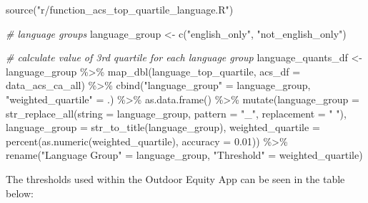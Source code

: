 \documentclass[
  11 pt,
  openany]{book}
\newenvironment{Shaded}{\begin{snugshade}}{\end{snugshade}}
\newcommand{\AttributeTok}[1]{\textcolor[rgb]{0.77,0.63,0.00}{#1}}
\newcommand{\CommentTok}[1]{\textcolor[rgb]{0.56,0.35,0.01}{\textit{#1}}}
\newcommand{\FloatTok}[1]{\textcolor[rgb]{0.00,0.00,0.81}{#1}}
\newcommand{\FunctionTok}[1]{\textcolor[rgb]{0.00,0.00,0.00}{#1}}
\newcommand{\NormalTok}[1]{#1}
\newcommand{\OtherTok}[1]{\textcolor[rgb]{0.56,0.35,0.01}{#1}}
\newcommand{\SpecialCharTok}[1]{\textcolor[rgb]{0.00,0.00,0.00}{#1}}
\newcommand{\StringTok}[1]{\textcolor[rgb]{0.31,0.60,0.02}{#1}}
\begin{document}
\begin{Shaded}
\begin{Highlighting}[]
\FunctionTok{source}\NormalTok{(}\StringTok{"r/function\_acs\_top\_quartile\_language.R"}\NormalTok{)}

\CommentTok{\# language groups}
\NormalTok{language\_group }\OtherTok{\textless{}{-}} \FunctionTok{c}\NormalTok{(}\StringTok{"english\_only"}\NormalTok{, }\StringTok{"not\_english\_only"}\NormalTok{)}

\CommentTok{\# calculate value of 3rd quartile for each language group}
\NormalTok{language\_quants\_df }\OtherTok{\textless{}{-}}
\NormalTok{  language\_group }\SpecialCharTok{\%\textgreater{}\%}
  \FunctionTok{map\_dbl}\NormalTok{(language\_top\_quartile, }\AttributeTok{acs\_df =}\NormalTok{ data\_acs\_ca\_all) }\SpecialCharTok{\%\textgreater{}\%}
  \FunctionTok{cbind}\NormalTok{(}\StringTok{"language\_group"} \OtherTok{=}\NormalTok{ language\_group,}
        \StringTok{"weighted\_quartile"} \OtherTok{=}\NormalTok{ .) }\SpecialCharTok{\%\textgreater{}\%}
  \FunctionTok{as.data.frame}\NormalTok{() }\SpecialCharTok{\%\textgreater{}\%} 
  \FunctionTok{mutate}\NormalTok{(}\AttributeTok{language\_group =} \FunctionTok{str\_replace\_all}\NormalTok{(}\AttributeTok{string =}\NormalTok{ language\_group,}
                                          \AttributeTok{pattern =} \StringTok{"\_"}\NormalTok{,}
                                          \AttributeTok{replacement =} \StringTok{" "}\NormalTok{),}
         \AttributeTok{language\_group =} \FunctionTok{str\_to\_title}\NormalTok{(language\_group),}
         \AttributeTok{weighted\_quartile =} \FunctionTok{percent}\NormalTok{(}\FunctionTok{as.numeric}\NormalTok{(weighted\_quartile), }\AttributeTok{accuracy =} \FloatTok{0.01}\NormalTok{)) }\SpecialCharTok{\%\textgreater{}\%} 
  \FunctionTok{rename}\NormalTok{(}\StringTok{"Language Group"} \OtherTok{=}\NormalTok{ language\_group,}
         \StringTok{"Threshold"} \OtherTok{=}\NormalTok{ weighted\_quartile)}
\end{Highlighting}
\end{Shaded}

The thresholds used within the Outdoor Equity App can be seen in the table below:
\end{document}
